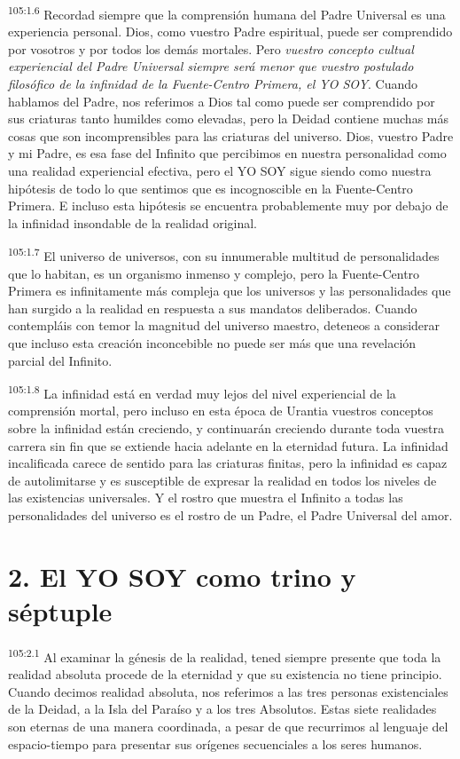 \par
\textsuperscript{105:1.6} Recordad siempre que la comprensión humana del Padre Universal es una experiencia personal. Dios, como vuestro Padre espiritual, puede ser comprendido por vosotros y por todos los demás mortales. Pero \textit{vuestro concepto cultual experiencial del Padre Universal siempre será menor que vuestro postulado filosófico de la infinidad de la Fuente-Centro Primera, el YO SOY}. Cuando hablamos del Padre, nos referimos a Dios tal como puede ser comprendido por sus criaturas tanto humildes como elevadas, pero la Deidad contiene muchas más cosas que son incomprensibles para las criaturas del universo. Dios, vuestro Padre y mi Padre, es esa fase del Infinito que percibimos en nuestra personalidad como una realidad experiencial efectiva, pero el YO SOY sigue siendo como nuestra hipótesis de todo lo que sentimos que es incognoscible en la Fuente-Centro Primera. E incluso esta hipótesis se encuentra probablemente muy por debajo de la infinidad insondable de la realidad original.

\par
\textsuperscript{105:1.7} El universo de universos, con su innumerable multitud de personalidades que lo habitan, es un organismo inmenso y complejo, pero la Fuente-Centro Primera es infinitamente más compleja que los universos y las personalidades que han surgido a la realidad en respuesta a sus mandatos deliberados. Cuando contempláis con temor la magnitud del universo maestro, deteneos a considerar que incluso esta creación inconcebible no puede ser más que una revelación parcial del Infinito.

\par
\textsuperscript{105:1.8} La infinidad está en verdad muy lejos del nivel experiencial de la comprensión mortal, pero incluso en esta época de Urantia vuestros conceptos sobre la infinidad están creciendo, y continuarán creciendo durante toda vuestra carrera sin fin que se extiende hacia adelante en la eternidad futura. La infinidad incalificada carece de sentido para las criaturas finitas, pero la infinidad es capaz de autolimitarse y es susceptible de expresar la realidad en todos los niveles de las existencias universales. Y el rostro que muestra el Infinito a todas las personalidades del universo es el rostro de un Padre, el Padre Universal del amor.

\section*{2. El YO SOY como trino y séptuple}
\par
\textsuperscript{105:2.1} Al examinar la génesis de la realidad, tened siempre presente que toda la realidad absoluta procede de la eternidad y que su existencia no tiene principio. Cuando decimos realidad absoluta, nos referimos a las tres personas existenciales de la Deidad, a la Isla del Paraíso y a los tres Absolutos. Estas siete realidades son eternas de una manera coordinada, a pesar de que recurrimos al lenguaje del espacio-tiempo para presentar sus orígenes secuenciales a los seres humanos.

